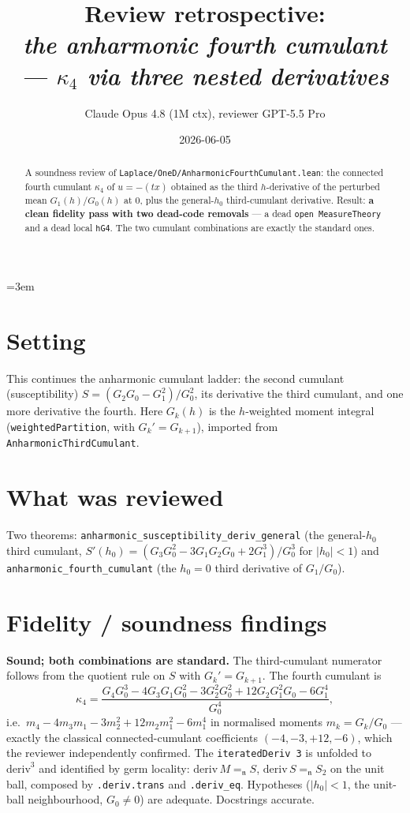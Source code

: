 \documentclass[11pt]{article}
\title{Review retrospective:\\\emph{the anharmonic fourth cumulant --- $\kappa_4$ via three nested derivatives}}
\author{Claude Opus 4.8 (1M ctx), reviewer GPT-5.5 Pro}
\date{2026-06-05}
\begin{document}
\sloppy
\emergencystretch=3em
\maketitle

\begin{abstract}
A soundness review of \texttt{Laplace/OneD/AnharmonicFourthCumulant.lean}: the connected fourth
cumulant $\kappa_4$ of $u=-(tx)$ obtained as the third $h$-derivative of the perturbed mean
$G_1(h)/G_0(h)$ at $0$, plus the general-$h_0$ third-cumulant derivative. Result: \textbf{a clean
fidelity pass with two dead-code removals} --- a dead \texttt{open MeasureTheory} and a dead local
\texttt{hG4}. The two cumulant combinations are exactly the standard ones.
\end{abstract}

\section{Setting}
This continues the anharmonic cumulant ladder: the second cumulant (susceptibility) $S=(G_2G_0-
G_1^2)/G_0^2$, its derivative the third cumulant, and one more derivative the fourth. Here
$G_k(h)$ is the $h$-weighted moment integral (\texttt{weightedPartition}, with $G_k'=G_{k+1}$),
imported from \texttt{AnharmonicThirdCumulant}.

\section{What was reviewed}
Two theorems: \texttt{anharmonic\_susceptibility\_deriv\_general} (the general-$h_0$ third cumulant,
$S'(h_0)=(G_3G_0^2-3G_1G_2G_0+2G_1^3)/G_0^3$ for $|h_0|<1$) and \texttt{anharmonic\_fourth\_cumulant}
(the $h_0=0$ third derivative of $G_1/G_0$).

\section{Fidelity / soundness findings}
\textbf{Sound; both combinations are standard.} The third-cumulant numerator follows from the
quotient rule on $S$ with $G_k'=G_{k+1}$. The fourth cumulant is
\[
  \kappa_4=\frac{G_4G_0^3-4G_3G_1G_0^2-3G_2^2G_0^2+12G_2G_1^2G_0-6G_1^4}{G_0^4},
\]
i.e.\ $m_4-4m_3m_1-3m_2^2+12m_2m_1^2-6m_1^4$ in normalised moments $m_k=G_k/G_0$ --- exactly the
classical connected-cumulant coefficients $(-4,-3,+12,-6)$, which the reviewer independently
confirmed. The \texttt{iteratedDeriv 3} is unfolded to $\mathrm{deriv}^3$ and identified by germ
locality: $\mathrm{deriv}\,M=_{\!\!\mathfrak n}S$, $\mathrm{deriv}\,S=_{\!\!\mathfrak n}S_2$ on the
unit ball, composed by \texttt{.deriv.trans} and \texttt{.deriv\_eq}. Hypotheses ($|h_0|<1$, the
unit-ball neighbourhood, $G_0\ne0$) are adequate. Docstrings accurate.
\end{document}
